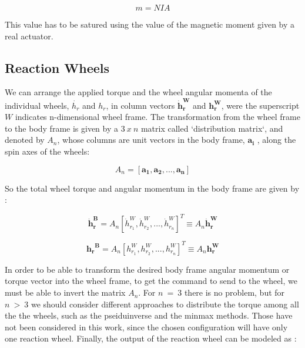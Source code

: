 \documentclass[11pt,a4paper]{report}
\begin{document}
\begin{equation}
 m = NIA
\end{equation}

This value has to be satured using the value of the magnetic moment given by a real actuator.

\subsection{Reaction Wheels}
We can arrange the applied torque and the wheel angular momenta of the individual wheels, $\dot{h_{r}}$ and $h_{r}$, in column vectors $\mathbf{\dot{h}_{r}^W}$ and $\mathbf{{h_{r}^W}}$, were the superscript $W$ indicates n-dimensional wheel frame. The transformation from the wheel frame to the body frame is given by a $3 \ x \ n$ matrix called `distribution matrix`, and denoted by $\mathit{A_{n}}$, whose columns are unit vectors in the body frame, $\mathbf{a_{i}}$ , along the spin axes of the wheels:

\begin{equation*}
 \mathit{A_{n}} = [\mathbf{a_{1}}, \mathbf{a_{2}},...,\mathbf{a_{n}}]
\end{equation*}

So the total wheel torque and angular momentum in the body frame are given by : 

\begin{equation}
 \mathbf{\dot{h}_{r}^B} = \mathit{A_{n}}[\mathit{\dot{h}_{r_{1}}^W},\mathit{\dot{h}_{r_{2}}^W},...,\mathit{\dot{h}_{r_{n}}^W}]^{T} \equiv \mathit{A_{n}} \mathbf{\dot{h}_{r}^W}
\end{equation}

\begin{equation}
 \mathbf{{h_{r}}^B} = \mathit{A_{n}}[\mathit{{h_{r_{1}}^W}},\mathit{{h_{r_{2}}^W}},...,\mathit{{h_{r_{n}}^W}}]^{T} \equiv \mathit{A_{n}} \mathbf{{h_{r}^W}}
\end{equation}

In order to be able to transform the desired body frame angular momentum or torque vector into the wheel frame, to get the command to send to the wheel, we must be able to invert the matrix $\mathit{A_{n}}$. For $n \ = \ 3$ there is no problem, but for $n \ > \ 3$ we should consider different approaches to distribute the torque among all the the wheels, such as the pseiduinverse and the minmax methods. Those have not been considered in this work, since the chosen configuration will have only one reaction wheel.
Finally, the output of the reaction wheel can be modeled as : 
\end{document}

